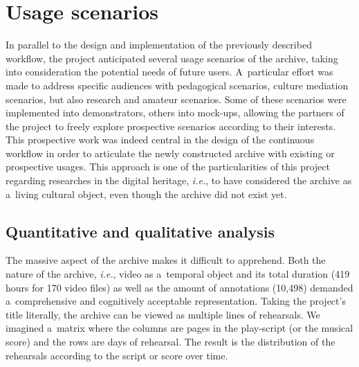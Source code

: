 \documentclass[conference]{IEEEtran}
\newcommand{\todo}[1]{\noindent\textcolor{red}{{\bf \{ToDo} #1{\bf \}}}}
\begin{document}
\section{Usage scenarios}
\label{sec:scenarios}
In parallel to the design and implementation of the previously described workflow, the project anticipated several usage scenarios of the archive, taking into consideration the potential needs of future users. A~particular effort was made to address specific audiences with pedagogical scenarios, culture mediation scenarios, but also research and amateur scenarios. Some of these scenarios were implemented into demonstrators, others into mock-ups, allowing the partners of the project to freely explore prospective scenarios according to their interests. This prospective work was indeed central in the design of the continuous workflow in order to articulate the newly constructed archive with existing or prospective usages. This approach is one of the particularities of this project regarding researches in the digital heritage, \emph{i.e.}, to have considered the archive as a~living cultural object, even though the archive did not exist yet.

\subsection{Quantitative and qualitative analysis}
The massive aspect of the archive makes it difficult to apprehend. Both the nature of the archive, \emph{i.e.}, video as a~temporal object\cite{stiegler98}  and its total duration (419 hours for 170 video files) as well as the amount of annotations (10,498) demanded a~comprehensive and cognitively acceptable representation. Taking the project's title literally,  the archive can be viewed as multiple lines of rehearsals. We imagined a~matrix where the columns are pages in the play-script  (or the musical score) and the rows are days of rehearsal. The result is the distribution of the rehearsals according to the script or score over time.

\end{document}
